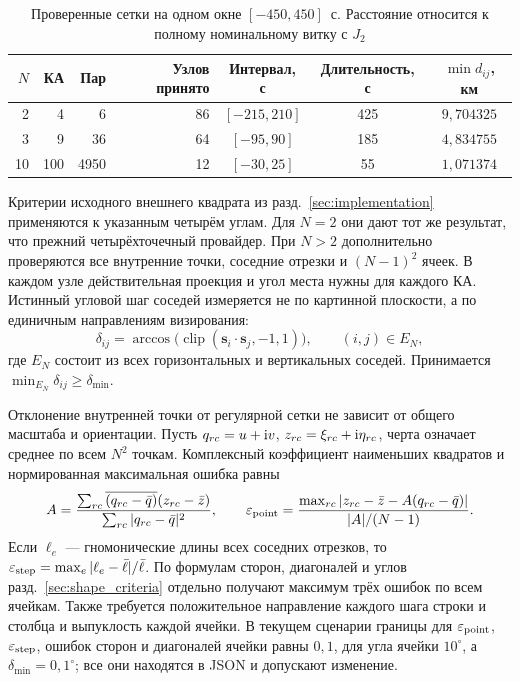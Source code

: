 \documentclass[a4paper,12pt]{article}
\begin{document}
\begin{table}[htbp]
\centering\small
\caption{Проверенные сетки на одном окне $[-450,450]$~с.
Расстояние относится к полному номинальному витку с $J_2$}
\label{tab:grid_results}
\begin{tabular}{rrrrccc}
\toprule
$N$ & КА & Пар & Узлов принято & Интервал, с & Длительность, с & $\min d_{ij}$, км\\
\midrule
2 & 4 & 6 & 86 & $[-215,210]$ & 425 & $9{,}704325$\\
3 & 9 & 36 & 64 & $[-95,90]$ & 185 & $4{,}834755$\\
10 & 100 & 4950 & 12 & $[-30,25]$ & 55 & $1{,}071374$\\
\bottomrule
\end{tabular}
\end{table}

Критерии исходного внешнего квадрата из
разд.~\ref{sec:implementation} применяются к
указанным четырём углам. Для $N=2$ они дают
тот же результат, что прежний четырёхточечный
провайдер. При $N>2$ дополнительно проверяются
все внутренние точки, соседние отрезки и
$(N-1)^2$ ячеек. В каждом узле действительная
проекция и угол места нужны для каждого КА.
Истинный угловой шаг соседей измеряется
не по картинной плоскости, а по единичным
направлениям визирования:
\begin{equation}
\delta_{ij}=\arccos\bigl(\operatorname{clip}
(\mathbf s_i\cdot\mathbf s_j,-1,1)\bigr),
\qquad (i,j)\in E_N,
\end{equation}
где $E_N$ состоит из всех горизонтальных и
вертикальных соседей. Принимается
$\min_{E_N}\delta_{ij}\geq\delta_{\min}$.

Отклонение внутренней точки от регулярной сетки
не зависит от общего масштаба и ориентации.
Пусть $q_{rc}=u+{\rm i}v$,
$z_{rc}=\xi_{rc}+{\rm i}\eta_{rc}$,
черта означает среднее по всем $N^2$ точкам.
Комплексный коэффициент наименьших квадратов
и нормированная максимальная ошибка равны
\begin{equation}
A=\frac{\sum_{rc}\overline{(q_{rc}-\bar q)}
(z_{rc}-\bar z)}{\sum_{rc}|q_{rc}-\bar q|^2},
\qquad
\varepsilon_{\rm point}=
\frac{\max_{rc}|z_{rc}-\bar z-A(q_{rc}-\bar q)|}
{|A|/(N-1)}.
\end{equation}
Если $\ell_e$ --- гномонические длины всех
соседних отрезков, то
$\varepsilon_{\rm step}=\max_e|\ell_e-\bar\ell|/
\bar\ell$. По формулам сторон, диагоналей и
углов разд.~\ref{sec:shape_criteria} отдельно
получают максимум трёх ошибок по всем ячейкам.
Также требуется положительное направление
каждого шага строки и столбца и выпуклость
каждой ячейки. В текущем сценарии границы для
$\varepsilon_{\rm point}$,
$\varepsilon_{\rm step}$, ошибок сторон и
диагоналей ячейки равны $0{,}1$,
для угла ячейки $10^\circ$, а
$\delta_{\min}=0{,}1^\circ$; все они находятся
в JSON и допускают изменение.
\end{document}
